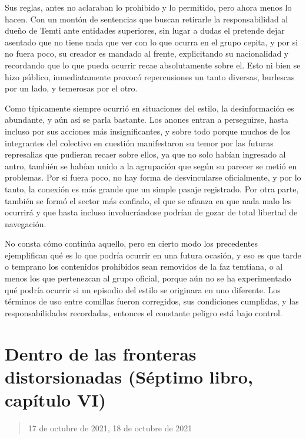 \documentclass[
]{book}
\begin{document}
Sus reglas, antes no aclaraban lo prohibido y lo permitido, pero ahora menos lo hacen. Con un montón de sentencias que buscan retirarle la responsabilidad al dueño de Temti ante entidades superiores, sin lugar a dudas el pretende dejar asentado que no tiene nada que ver con lo que ocurra en el grupo cepita, y por si no fuera poco, su creador es mandado al frente, explicitando su nacionalidad y recordando que lo que pueda ocurrir recae absolutamente sobre el. Esto ni bien se hizo público, inmediatamente provocó repercusiones un tanto diversas, burlescas por un lado, y temerosas por el otro.

Como típicamente siempre ocurrió en situaciones del estilo, la desinformación es abundante, y aún así se parla bastante. Los anones entran a perseguirse, hasta incluso por sus acciones más insignificantes, y sobre todo porque muchos de los integrantes del colectivo en cuestión manifestaron su temor por las futuras represalias que pudieran recaer sobre ellos, ya que no solo habían ingresado al antro, también se habían unido a la agrupación que según su parecer se metió en problemas. Por si fuera poco, no hay forma de desvincularse oficialmente, y por lo tanto, la conexión es más grande que un simple pasaje registrado. Por otra parte, también se formó el sector más confiado, el que se afianza en que nada malo les ocurrirá y que hasta incluso involucrándose podrían de gozar de total libertad de navegación.

No consta cómo continúa aquello, pero en cierto modo los precedentes ejemplifican qué es lo que podría ocurrir en una futura ocasión, y eso es que tarde o temprano los contenidos prohibidos sean removidos de la faz temtiana, o al menos los que pertenezcan al grupo oficial, porque aún no se ha experimentado qué podría ocurrir si un episodio del estilo se originara en uno diferente. Los términos de uso entre comillas fueron corregidos, sus condiciones cumplidas, y las responsabilidades recordadas, entonces el constante peligro está bajo control.

\hypertarget{dentro-de-las-fronteras-distorsionadas-suxe9ptimo-libro-capuxedtulo-vi}{%
\section{Dentro de las fronteras distorsionadas (Séptimo libro, capítulo VI)}\label{dentro-de-las-fronteras-distorsionadas-suxe9ptimo-libro-capuxedtulo-vi}}

\begin{quote}
17 de octubre de 2021, 18 de octubre de 2021
\end{quote}
\end{document}
